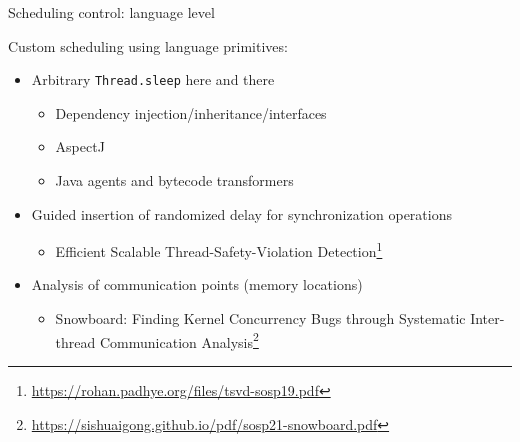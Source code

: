 
\begin{frame}{Scheduling control: language level}

Custom scheduling using language primitives:
\begin{itemize}
  \item Arbitrary \texttt{Thread.sleep} here and there
  \begin{itemize}
    \item Dependency injection/inheritance/interfaces
    \item AspectJ
    \item Java agents and bytecode transformers
  \end{itemize}
  
  \pause

  \item Guided insertion of randomized delay for synchronization operations
  \begin{itemize}
    \item Efficient Scalable Thread-Safety-Violation Detection\footnote<2->{\tiny\url{https://rohan.padhye.org/files/tsvd-sosp19.pdf}}
  \end{itemize}

  \pause

  \item Analysis of communication points (memory locations)
  \begin{itemize}
    \item Snowboard: Finding Kernel Concurrency Bugs through Systematic Inter-thread Communication Analysis\footnote<3->{\tiny\url{https://sishuaigong.github.io/pdf/sosp21-snowboard.pdf}}
  \end{itemize}
\end{itemize}
\end{frame}


